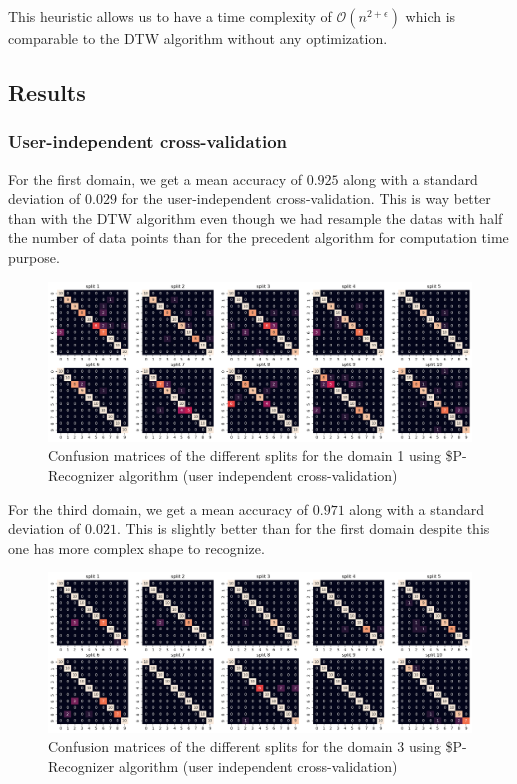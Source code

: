 This heuristic allows us to have a time complexity of $\mathcal{O}(n^{2 + \epsilon})$ which is comparable to the DTW algorithm without any optimization.

\subsection{Results}

\subsubsection{User-independent cross-validation}

For the first domain, we get a mean accuracy of $0.925$ along with a standard deviation of $0.029$ for the user-independent cross-validation. This is way better than with the DTW algorithm even though we had resample the datas with half the number of data points than for the precedent algorithm for computation time purpose.

\begin{figure}[H]
	\centering
	\includegraphics{figures/pcr/domain01/cm_pcr_d1_uindep.png}
	\caption{Confusion matrices of the different splits for the domain 1 using \$P-Recognizer algorithm (user independent cross-validation)}
	\label{fig:cm-pcr-d1-uindep}
\end{figure}

For the third domain, we get a mean accuracy of $0.971$ along with a standard deviation of $0.021$. This is slightly better than for the first domain despite this one has more complex shape to recognize.

\begin{figure}[H]
	\centering
	\includegraphics{figures/pcr/domain03/cm_pcr_d3_uindep.png}
	\caption{Confusion matrices of the different splits for the domain 3 using \$P-Recognizer algorithm (user independent cross-validation)}
	\label{fig:cm-pcr-d3-uindep}
\end{figure}


